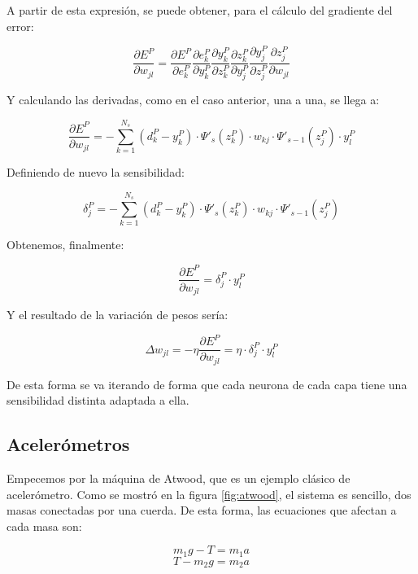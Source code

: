 \documentclass[12pt]{article}
\numberwithin{equation}{section}
\begin{document}
{A partir de esta expresión, se puede obtener, para el cálculo del gradiente del error:

\begin{equation}
\frac{\partial E^P}{\partial w_{jl}} = \frac{\partial E^P}{\partial e_{k}^P} \frac{\partial e^P_k}{\partial y_{k}^P} \frac{\partial y^P_k}{\partial z_{k}^P} \frac{\partial z^P_k}{\partial y_j^P} \frac{\partial y^P_j}{\partial z_j^P} \frac{\partial z^P_j}{\partial w_{jl}}
\end{equation}

Y calculando las derivadas, como en el caso anterior, una a una, se llega a:

\begin{equation}
\frac{\partial E^P}{\partial w_{jl}} =-\sum _{k=1}^{N_s}(d_k^P-y_k^P) \cdot \Psi ' _s(z_k^P) \cdot w_{kj} \cdot \Psi '_{s-1}(z_j^P) \cdot y_l^P
\end{equation}

Definiendo de nuevo la sensibilidad:

\begin{equation}
\delta _j^P = -\sum _{k=1}^{N_s}(d_k^P-y_k^P) \cdot \Psi ' _s(z_k^P) \cdot w_{kj} \cdot \Psi '_{s-1}(z_j^P)
\end{equation}

Obtenemos, finalmente:

\begin{equation}
\frac{\partial E^P}{\partial w_{jl}} = \delta _j^P \cdot y_l^P
\end{equation}

Y el resultado de la variación de pesos sería: 

\begin{equation}
\Delta w_{jl} = -\eta \frac{\partial E^P}{\partial w_{jl}} = \eta \cdot \delta _j^P \cdot y_l^P
\end{equation}

De esta forma se va iterando de forma que cada neurona de cada capa tiene una sensibilidad distinta adaptada a ella.

\subsection{Acelerómetros}

Empecemos por la máquina de Atwood, que es un ejemplo clásico de acelerómetro. Como se mostró en la figura \ref{fig:atwood}, el sistema es sencillo, dos masas conectadas por una cuerda. De esta forma, las ecuaciones que afectan a cada masa son:

\begin{equation}
m_1 g -T = m_1 a
\end{equation}
\begin{equation}
T - m_2 g = m_2 a
\end{equation}

}
\end{document}
